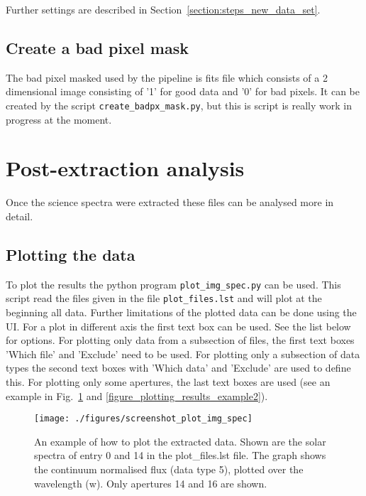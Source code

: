 \documentclass[10pt,a4paper]{article}
\begin{document}
\noindent Further settings are described in Section~\ref{section:steps_new_data_set}.

\subsection{Create a bad pixel mask}
\noindent The bad pixel masked used by the pipeline is fits file which consists of a 2 dimensional image consisting of '1' for good data and '0' for bad pixels. It can be created by the script \verb|create_badpx_mask.py|, but this is script is really work in progress at the moment.


\newpage
\section{Post-extraction analysis}

\noindent Once the science spectra were extracted these files can be analysed more in detail. 

\subsection{Plotting the data}

To plot the results the python program \verb|plot_img_spec.py| can be used. This script read the files given in the file \verb|plot_files.lst| and will plot at the beginning all data. Further limitations of the plotted data can be done using the UI. For a plot in different axis the first text box can be used. See the list below for options. For plotting only data from a subsection of files, the first text boxes 'Which file' and 'Exclude' need to be used. For plotting only a subsection of data types the second text boxes with 'Which data' and 'Exclude' are used to define this. For plotting only some apertures, the last text boxes are used (see an example in Fig.~\ref{figure_plotting_results_example1} and \ref{figure_plotting_results_example2}).

\begin{figure} 
  \begin{center}
    \texttt{[image: ./figures/screenshot\_plot\_img\_spec]}
  \end{center} 
  \caption{An example of how to plot the extracted data. Shown are the solar spectra of entry 0 and 14 in the plot\_files.lst file. The graph shows the continuum normalised flux (data type 5), plotted over the wavelength (w). Only apertures 14 and 16 are shown.
    \label{figure_plotting_results_example1}}
\end{figure}
\end{document}
